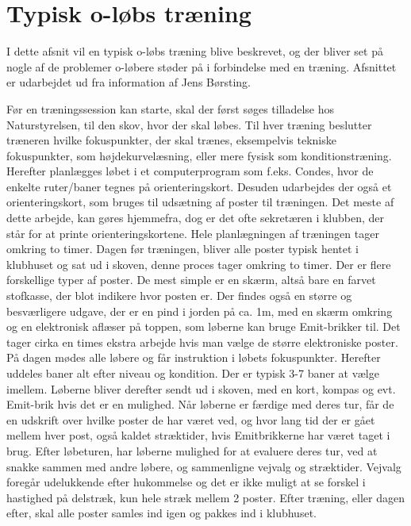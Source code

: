 \chapter{Typisk o-løbs træning}
I dette afsnit vil en typisk o-løbs træning blive beskrevet, og der bliver set på nogle af de problemer o-løbere støder på i forbindelse med en træning. Afsnittet er udarbejdet ud fra information af Jens Børsting.

Før en træningssession kan starte, skal der først søges tilladelse hos Naturstyrelsen, til den skov, hvor der skal løbes. \newline
Til hver træning beslutter træneren hvilke fokuspunkter, der skal trænes, eksempelvis tekniske fokuspunkter, som højdekurvelæsning, eller mere fysisk som konditionstræning. Herefter planlægges løbet i et computerprogram som f.eks. Condes, hvor de enkelte ruter/baner tegnes på orienteringskort. Desuden udarbejdes der også et orienteringskort, som bruges til udsætning af poster til træningen. Det meste af dette arbejde, kan gøres hjemmefra, dog er det ofte sekretæren i klubben, der står for at printe orienteringskortene. Hele planlægningen af træningen tager omkring to timer. Dagen før træningen, bliver alle poster typisk hentet i klubhuset og sat ud i skoven, denne proces tager omkring to timer. Der er flere forskellige typer af poster. De mest simple er en skærm, altså bare en farvet stofkasse, der blot indikere hvor posten er. Der findes også en større og besværligere udgave, der er en pind i jorden på ca. 1m, med en skærm omkring og en elektronisk aflæser på toppen, som løberne kan bruge Emit-brikker til. Det tager cirka en times ekstra arbejde hvis man vælge de større elektroniske poster.\newline
På dagen mødes alle løbere og får instruktion i løbets fokuspunkter. Herefter uddeles baner alt efter niveau og kondition. Der er typisk 3-7 baner at vælge imellem. Løberne bliver derefter sendt ud i skoven, med en kort, kompas og evt. Emit-brik hvis det er en mulighed. Når løberne er færdige med deres tur, får de en udskrift over hvilke poster de har været ved, og hvor lang tid der er gået mellem hver post, også kaldet stræktider, hvis Emitbrikkerne har været taget i brug.
Efter løbeturen, har løberne mulighed for at evaluere deres tur, ved at snakke sammen med andre løbere, og sammenligne vejvalg og stræktider. Vejvalg foregår udelukkende efter hukommelse og det er ikke muligt at se forskel i hastighed på delstræk, kun hele stræk mellem 2 poster. 
Efter træning, eller dagen efter, skal alle poster samles ind igen og pakkes ind i klubhuset.\newline


